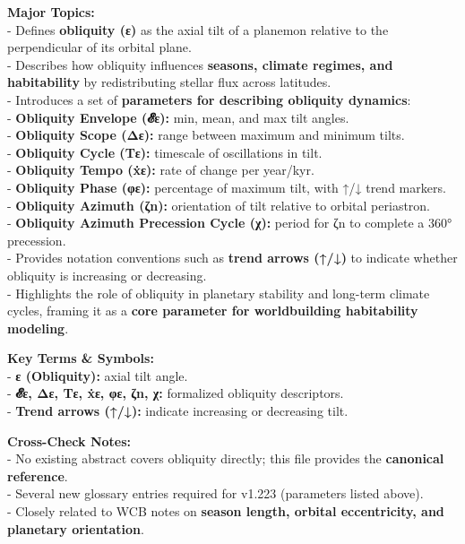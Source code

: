 \documentclass[
  letterpaper,
]{book}
\begin{document}
\textbf{Major Topics:}\\
- Defines \textbf{obliquity (ε)} as the axial tilt of a planemon
relative to the perpendicular of its orbital plane.\\
- Describes how obliquity influences \textbf{seasons, climate regimes,
and habitability} by redistributing stellar flux across latitudes.\\
- Introduces a set of \textbf{parameters for describing obliquity
dynamics}:\\
- \textbf{Obliquity Envelope (𝓔ε):} min, mean, and max tilt angles.\\
- \textbf{Obliquity Scope (Δε):} range between maximum and minimum
tilts.\\
- \textbf{Obliquity Cycle (Tε):} timescale of oscillations in tilt.\\
- \textbf{Obliquity Tempo (ẋε):} rate of change per year/kyr.\\
- \textbf{Obliquity Phase (φε):} percentage of maximum tilt, with ↑/↓
trend markers.\\
- \textbf{Obliquity Azimuth (ζn):} orientation of tilt relative to
orbital periastron.\\
- \textbf{Obliquity Azimuth Precession Cycle (χ):} period for ζn to
complete a 360° precession.\\
- Provides notation conventions such as \textbf{trend arrows (↑/↓)} to
indicate whether obliquity is increasing or decreasing.\\
- Highlights the role of obliquity in planetary stability and long-term
climate cycles, framing it as a \textbf{core parameter for worldbuilding
habitability modeling}.

\textbf{Key Terms \& Symbols:}\\
- \textbf{ε (Obliquity):} axial tilt angle.\\
- \textbf{𝓔ε, Δε, Tε, ẋε, φε, ζn, χ:} formalized obliquity
descriptors.\\
- \textbf{Trend arrows (↑/↓):} indicate increasing or decreasing tilt.

\textbf{Cross-Check Notes:}\\
- No existing abstract covers obliquity directly; this file provides the
\textbf{canonical reference}.\\
- Several new glossary entries required for v1.223 (parameters listed
above).\\
- Closely related to WCB notes on \textbf{season length, orbital
eccentricity, and planetary orientation}.
\end{document}
